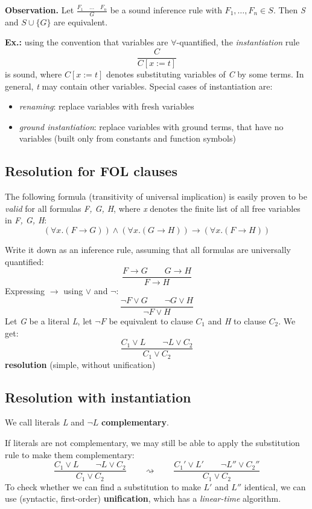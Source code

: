 \documentclass[11pt]{article}
\begin{document}
\textbf{Observation.} Let $\frac{F_1 \quad \dots \quad F_n}{G}$ be a sound inference rule with $F_1, \dots, F_n \in S$. Then \textit{S} and $S \cup \{G\}$ are equivalent.

\textbf{Ex.:} using the convention that variables are $\forall$-quantified, the \textit{instantiation} rule
\[
    \frac{C}{C[x := t]}
\]
is sound, where $C[x := t]$ denotes substituting variables of \textit{C} by some terms. In general, \textit{t} may contain other variables. Special cases of instantiation are:
\begin{itemize}
    \item \textit{renaming}: replace variables with fresh variables
    \item \textit{ground instantiation}: replace variables with ground terms, that have no variables (built only from constants and function symbols)
\end{itemize}

\subsection*{Resolution for FOL clauses}

The following formula (transitivity of universal implication) is easily proven to be \textit{valid} for all formulas \textit{F, G, H}, where \textit{x} denotes the finite list of all free variables in \textit{F, G, H}:
\[
    (\forall x. (F \to G)) \land (\forall x. (G \to H)) \to (\forall x. (F \to H))
\]

Write it down as an inference rule, assuming that all formulas are universally quantified:
\[
    \frac{F \to G \qquad G \to H}{F \to H}
\]
Expressing $\to$ using $\lor$ and $\neg$:
\[
    \frac{\neg F \lor G \qquad \neg G \lor H}{\neg F \lor H}
\]
Let \textit{G} be a literal \textit{L}, let $\neg F$ be equivalent to clause $C_1$ and \textit{H} to clause $C_2$. We get:
\[
    \frac{C_1 \lor L \qquad \neg L \lor C_2}{C_1 \lor C_2}
\]
\textbf{resolution} (simple, without unification)

\subsection*{Resolution with instantiation}

We call literals \textit{L} and $\neg L$ \textbf{complementary}.

If literals are not complementary, we may still be able to apply the substitution rule to make them complementary:
\[
    \frac{C_1 \lor L \qquad \neg L \lor C_2}{C_1 \lor C_2}
    \qquad \rightsquigarrow \qquad
    \frac{C_1' \lor L' \qquad \neg L'' \lor C_2''}{C_1 \lor C_2}
\]
To check whether we can find a substitution to make $L'$ and $L''$ identical, we can use (syntactic, first-order) \textbf{unification}, which has a \textit{linear-time} algorithm.
\end{document}
